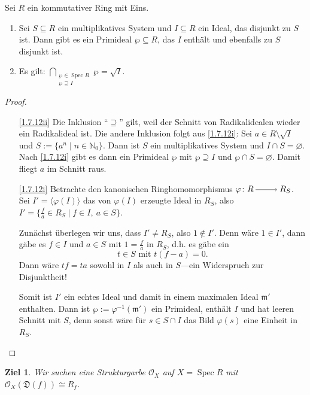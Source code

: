 \documentclass[a4paper,12pt,index=toc]{scrbook}
\theoremstyle{keinenummern} %
\newtheorem{ziel}{Ziel}
\def\O{\mathcal{O}}
\newcommand{\D}{\mathfrak{D}}
\def\m{\mathfrak{m}}
\newcommand{\Spec}{\operatorname{Spec}}
\renewcommand{\phi}{\varphi}
\newcommand{\leer}{\ensuremath{\varnothing}}
\newcommand{\set}[1]{\ensuremath{\mathbb{#1}}}
\newcommand{\N}{\set{N}}
\begin{document}
\begin{lem}\label{1.7.12}
  Sei $R$ ein kommutativer Ring mit Eins.
  \begin{enumerate}
  \item{} Sei $S\subseteq R$ ein multiplikatives System und $I\subseteq R$ ein Ideal, das disjunkt zu $S$ ist. Dann
    gibt es ein Primideal $\wp\subseteq R$, das $I$ enthält und ebenfalls zu $S$ disjunkt ist.
  \item{} Es gilt: $\displaystyle\!\!\!\bigcap_{\substack{\wp\in\Spec R\\\wp\supseteq I}}\!\!\!\wp = \sqrt{I}$.
  \end{enumerate}
\end{lem}
\begin{proof}
  \begin{enumerate}
  \item[\ref{1.7.12ii}] Die Inklusion \enquote{$\supseteq$} gilt, weil der Schnitt von Radikalidealen wieder ein Radikalideal
    ist. Die andere Inklusion folgt aus \ref{1.7.12i}: Sei $a\in R\setminus\sqrt{I}$ und $S:=\{a^n\mid n\in\N_0\}$. Dann ist $S$
    ein multiplikatives System und $I\cap S=\leer$. Nach \ref{1.7.12i} gibt es dann ein Primideal $\wp$ mit $\wp\supseteq I$ und
    $\wp\cap S=\leer$. Damit fliegt $a$ im Schnitt raus.
  \item[\ref{1.7.12i}] Betrachte den kanonischen Ringhomomorphismus $\phi\colon R\ra R_S$. Sei $I'=\langle\phi(I)\rangle$ das von $\phi(I)$
    erzeugte Ideal in $R_S$, also $I'=\{\frac{f}{a}\in R_S\mid f\in I,\ a\in S\}$.

    Zunächst überlegen wir uns, dass $I'\neq R_S$, also $1\notin I'$. Denn wäre $1\in I'$, dann gäbe es $f\in I$ und $a\in S$
    mit $1=\frac{f}{a}$ in $R_S$, d.h. es gäbe ein
    \begin{equation*}t\in S\text{ mit }t(f-a)=0.\end{equation*} 
    Dann wäre $tf=ta$ sowohl in $I$ als auch in $S$---ein Widerspruch zur Disjunktheit!

    Somit ist $I'$ ein echtes Ideal und damit in einem maximalen Ideal $\m'$ enthalten. Dann ist $\wp:=\phi^{-1}(\m')$ ein
    Primideal, enthält $I$ und hat leeren Schnitt mit $S$, denn sonst wäre für $s\in S\cap I$ das Bild $\phi(s)$ eine Einheit in
    $R_S$.
  \end{enumerate}
\end{proof}

\begin{ziel}
  Wir suchen eine Strukturgarbe $\O_X$ auf $X=\Spec R$ mit $\O_X(\D(f))\cong R_f$.
\end{ziel}
\end{document}
